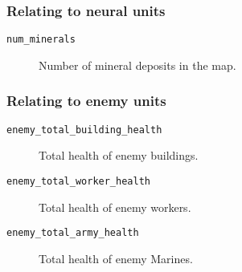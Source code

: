 \subsubsection*{Relating to neural units}
\begin{description}
    \item[\texttt{num\_minerals}] Number of mineral deposits in the map.
\end{description}

\subsubsection*{Relating to enemy units}
\begin{description}
    \item[\texttt{enemy\_total\_building\_health}] Total health of enemy buildings.
    \item[\texttt{enemy\_total\_worker\_health}] Total health of enemy workers.
    \item[\texttt{enemy\_total\_army\_health}] Total health of enemy Marines.
\end{description}